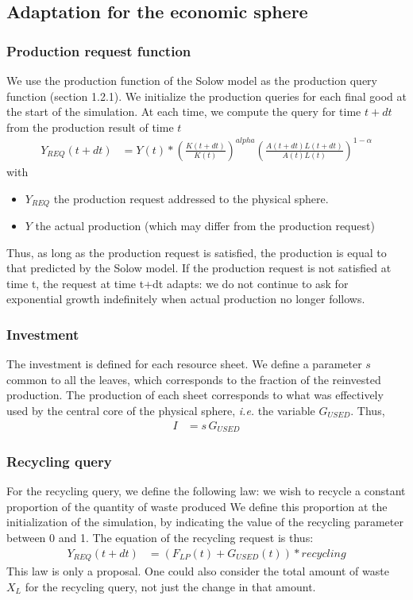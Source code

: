 \documentclass[12pt,a4paper]{article}%
\begin{document}
\begin{appendix}
\subsection{Adaptation for the economic sphere}
\subsubsection{Production request function}
We use the production function of the Solow model as the production query function (section 1.2.1).  We initialize the production queries for each final good at the start of the simulation. At each time, we compute the query for time $t+dt$ from the production result of time $t$
\begin{align}
	 Y_{REQ}(t+dt) &= Y(t)\ast\left( \frac{K(t+dt)}{K(t)}\right) ^{alpha}\left( \frac{A(t+dt)L(t+dt)}{A(t)L(t)}\right) ^{1- \alpha}%
\end{align}
with 
\begin{itemize} 
	\item $Y_{REQ}$ the production request addressed to the physical sphere.  
	\item $Y$ the actual production (which may differ from the production request) 
\end{itemize} 
Thus, as long as the production request is satisfied, the production is equal to that predicted by the Solow model. If the production request is not satisfied at time t, the request at time t+dt adapts: we do not continue to ask for exponential growth indefinitely when actual production no longer follows.  

\subsubsection{Investment}
The investment is defined for each resource sheet. We define a parameter $s$ common to all the leaves, which corresponds to the fraction of the reinvested production. The production of each sheet corresponds to what was effectively used by the central core of the physical sphere, \textit{i.e.} the variable $G_{USED}$.  Thus, 
\begin{align}
	I &= s\, G_{USED}
\end{align}

\subsubsection{Recycling query} 
For the recycling query, we define the following law: we wish to recycle a constant proportion of the quantity of waste produced We define this proportion at the initialization of the simulation, by indicating the value of the recycling parameter between 0 and 1. The equation of the recycling request is thus:
\begin{align}
	Y_{REQ}(t+dt) &= (F_{LP}(t)+G_{USED}(t))\ast recycling
\end{align}
This law is only a proposal. One could also consider the total amount of waste $X_{L}$ for the recycling query, not just the change in that amount.  


\end{appendix}
\end{document}
